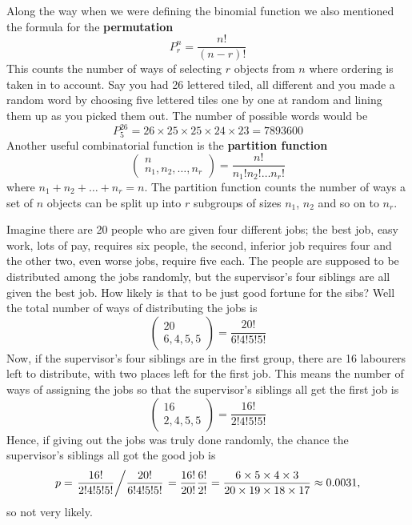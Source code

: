 \documentclass[11pt,a4paper]{scrartcl}
\begin{document}
Along the way when we were defining the binomial function we also mentioned the formula for the \textbf{permutation}
\begin{equation}
P^n_r=\frac{n!}{(n-r)!}
\end{equation}
This counts the number of ways of selecting $r$ objects from $n$ where
ordering is taken in to account. Say you had 26 lettered tiled, all
different and you made a random word by choosing five lettered tiles one by one at
random and lining them up as you picked them out. The number of possible words would be
\begin{equation}
P^{26}_5=26\times 25\times 25\times 24\times 23=7893600
\end{equation}
Another useful combinatorial function is the \textbf{partition function}
\begin{equation}
\left(\begin{array}{c} n\\n_1,n_2,\ldots,n_r\end{array}\right)=\frac{n!}{n_1!n_2!\ldots n_r!}
\end{equation}
where $n_1+n_2+\ldots+n_r=n$. The partition function counts the number
of ways a set of $n$ objects can be split up into $r$ subgroups of
sizes $n_1$, $n_2$ and so on to $n_r$.

Imagine there are 20 people who are given four different jobs; the best
job, easy work, lots of pay, requires six people, the second,
inferior job requires four and the other two, even worse jobs, require
five each. The people are supposed to be distributed among the jobs
randomly, but the supervisor's four siblings are all given the best
job. How likely is that to be just good fortune for the sibs? Well the
total number of ways of distributing the jobs is
\begin{equation}
\left(\begin{array}{c} 20\\6,4,5,5\end{array}\right)=\frac{20!}{6!4!5!5!}
\end{equation}
Now, if the supervisor's four siblings are in the first group, there
are 16 labourers left to distribute, with two places left for the first job. This means the number of ways of assigning the jobs so that the supervisor's siblings all get the first job is
\begin{equation}
\left(\begin{array}{c} 16\\2,4,5,5\end{array}\right)=\frac{16!}{2!4!5!5!}
\end{equation}
Hence, if giving out the jobs was truly done randomly, the chance the supervisor's siblings all got the good job is
\begin{equation}
p=\left.\frac{16!}{2!4!5!5!}\middle/\frac{20!}{6!4!5!5!}\right.=\frac{16!}{20!}\frac{6!}{2!}
=\frac{6\times 5\times 4\times 3}{20\times 19\times 18\times 17}
\approx 0.0031,
\end{equation}
so not very likely.
\newpage




\end{document}

